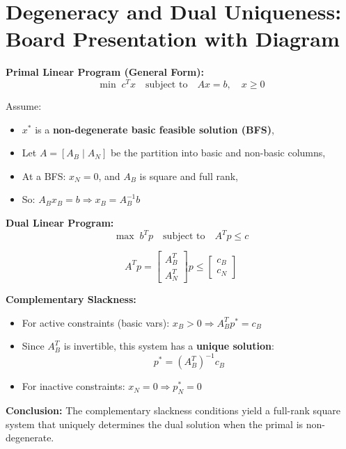 \documentclass{article}
\begin{document}
\section*{Degeneracy and Dual Uniqueness: Board Presentation with Diagram}

\textbf{Primal Linear Program (General Form):}
\[
\min \; c^T x \quad \text{subject to} \quad A x = b, \quad x \geq 0
\]

Assume:
\begin{itemize}
    \item \( x^* \) is a \textbf{non-degenerate basic feasible solution (BFS)},
    \item Let \( A = [A_B \;|\; A_N] \) be the partition into basic and non-basic columns,
    \item At a BFS: \( x_N = 0 \), and \( A_B \) is square and full rank,
    \item So: \( A_B x_B = b \Rightarrow x_B = A_B^{-1} b \)
\end{itemize}

\vspace{1em}

\textbf{Dual Linear Program:}
\[
\max \; b^T p \quad \text{subject to} \quad A^T p \leq c
\]

\[
A^T p =
\begin{bmatrix}
A_B^T \\
A_N^T
\end{bmatrix}
p
\leq
\begin{bmatrix}
c_B \\
c_N
\end{bmatrix}
\]

\textbf{Complementary Slackness:}
\begin{itemize}
    \item For active constraints (basic vars): \( x_B > 0 \Rightarrow A_B^T p^* = c_B \)
    \item Since \( A_B^T \) is invertible, this system has a \textbf{unique solution}:
    \[
    p^* = (A_B^T)^{-1} c_B
    \]
    \item For inactive constraints: \( x_N = 0 \Rightarrow p_N^* = 0 \)
\end{itemize}

\vspace{1em}

\textbf{Conclusion:} The complementary slackness conditions yield a full-rank square system that uniquely determines the dual solution when the primal is non-degenerate.

\vspace{2em}
\end{document}
